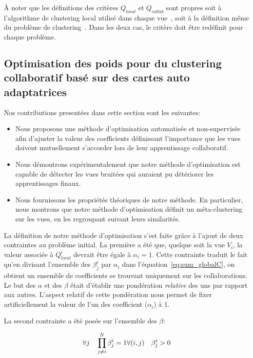 À noter que les définitions des critères $Q_{local}$ et $Q_{collab}$ sont propres soit à l'algorithme de clustering local utilisé dans chaque vue~\cite{ghassany2012collaborative}, soit à la définition m\^{e}me du problème de clustering~\cite{sublime2018information}. Dans les deux cas, le critère doit \^{e}tre redéfinit pour chaque problème.

\subsection{Optimisation des poids pour du clustering collaboratif bas\'{e} sur des cartes auto adaptatrices}

Nos contributions presentées dans cette section sont les suivantes:
\begin{itemize}
    \item Nous proposons une méthode d'optimisation automatisée et non-supervisée afin d'ajuster la valeur des coefficients définissant l'importance que les vues doivent mutuellement s'accorder lors de leur apprentissage collaboratif.
    \item Nous démontrons expérimentalement que notre méthode d'optimisation est capable de détecter les vues bruitées qui auraient pu détériorer les apprentissages finaux.
    \item Nous fournissons les propriétés théoriques de notre méthode. En particulier, nous montrons que notre méthode d'optimisation définit un méta-clustering sur les vues, en les regroupant suivant leurs similarités.
\end{itemize}

La définition de notre méthode d'optimisation s'est faite grâce à l'ajout de deux contraintes au problème initial. La première a été que, quelque soit la vue $V_i$, la valeur associée à $Q^i_{local}$ devrait \^{e}tre égale à $\alpha_i=1$. Cette contrainte traduit le fait qu'en divisant l'ensemble des $\beta_j^i$ par $\alpha_i$ dans l'équation~\ref{eq:sum_globalC}, on obtient un ensemble de coefficients se trouvant uniquement sur les collaborations. Le but des $\alpha$ et des $\beta$ était d'établir une pondération \textit{relative} des uns par rapport aux autres. L'aspect relatif de cette pondération nous permet de fixer artificiellement la valeur de l'un des coefficient ($\alpha_i$) à 1.

La second contrainte a été posée sur l'ensemble des $\beta$:

\begin{equation}
    \forall j \quad \prod_{j \neq i}^N \beta_j^i = 1 \\
    \forall (i,j) \quad \beta_j^i >0 
\end{equation}

